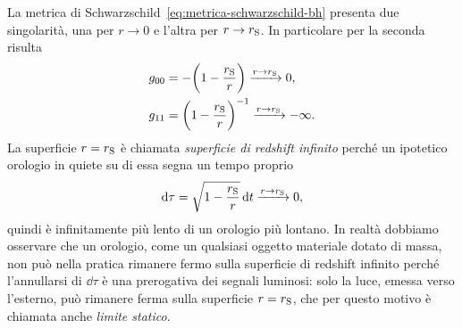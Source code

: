 La metrica di Schwarzschild~\eqref{eq:metrica-schwarzschild-bh} presenta due
singolarità, una per \(r \to 0\) e l'altra per \(r \to r_{\textup{S}}\).  In
particolare per la seconda risulta
\begin{subequations}
  \begin{align}
    g_{00} &= -\biggl(1 - \frac{r_{\textup{S}}}{r}\biggr) \xrightarrow{r\to
             r_{\textup{S}}} 0, \\
    g_{11} &= \biggl(1 - \frac{r_{\textup{S}}}{r}\biggr)^{-1} \xrightarrow{r\to
             r_{\textup{S}}} -\infty.
  \end{align}
\end{subequations}
La superficie \(r = r_{\textup{S}}\) è chiamata \emph{superficie di redshift
  infinito} perché un ipotetico orologio in quiete su di essa segna un tempo
proprio
\begin{equation}
  \mathop{}\!\mathrm{d}\tau = \sqrt{1 - \frac{r_{\textup{S}}}{r}}\mathop{}\!\mathrm{d} t \xrightarrow{r\to
    r_{\textup{S}}} 0,
\end{equation}
quindi è infinitamente più lento di un orologio più lontano.  In realtà dobbiamo
osservare che un orologio, come un qualsiasi oggetto materiale dotato di massa,
non può nella pratica rimanere fermo sulla superficie di redshift infinito
perché l'annullarsi di \(\dd\tau\) è una prerogativa dei segnali luminosi: solo
la luce, emessa verso l'esterno, può rimanere ferma sulla superficie \(r =
r_{\textup{S}}\), che per questo motivo è chiamata anche \emph{limite statico}.

